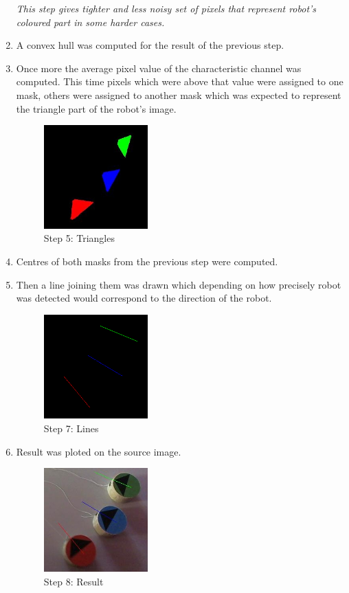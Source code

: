 \documentclass[10pt,a4paper,twocolumn]{article}
\begin{document}
\begin{enumerate}
\textit{This step gives tighter and less noisy set of pixels that represent robot's coloured part in some harder cases.}
\item A convex hull was computed for the result of the previous step. 
\item Once more the average pixel value of the characteristic channel was computed. This time pixels which were above that value were assigned to one mask, others were assigned to another mask which was expected to represent the triangle part of the robot's image.
\begin{figure}[h]
\centering
\includegraphics[width=40mm]{d1_i5_triangles.jpg}
 \caption{Step 5: Triangles}
\end{figure} 
\item Centres of both masks from the previous step were computed. 
\item Then a line joining them was drawn which depending on how precisely robot was detected would correspond to the direction of the robot.
\begin{figure}[h]
\centering
\includegraphics[width=40mm]{d1_i5_lines.png}
 \caption{Step 7: Lines}
\end{figure} 
\item Result was ploted on the source image.
\begin{figure}[h]
\centering
\includegraphics[width=40mm]{d1_i5_result.jpg}
 \caption{Step 8: Result}
\end{figure} 
\end{enumerate} 
\end{document}
